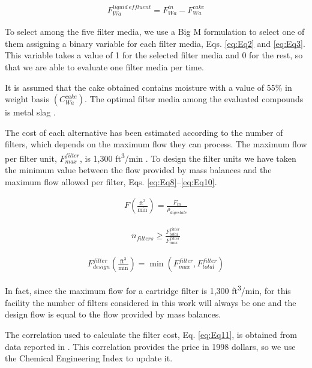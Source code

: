 \begin{refsection}[referencesCh2]
\begin{align}
	F_{Wa}^{{{liquid \ effluent}}} = F_{Wa}^{{in}} - F_{Wa}^{{cake}} \label{eq:Eq7}
\end{align}

To select among the five filter media, we use a Big M formulation to select one of them assigning a binary variable {} for each filter media, Eqs. \ref{eq:Eq2} and \ref{eq:Eq3}. This variable takes a value of 1 for the selected filter media and 0 for the rest, so that we are able to evaluate one filter media per time.

It is assumed that the cake obtained contains moisture with a value of 55\% in weight basis $\left(C_{Wa}^{cake}\right)$. The optimal filter media among the evaluated compounds is metal slag \citep{li2015study}.

The cost of each alternative has been estimated according to the number of filters, which depends on the maximum flow they can process. The maximum flow per filter unit, $F_{max}^{{filter}}$, is 1,300 ft\textsuperscript{3}/min \citep{loh2002process}. To design the filter units we have taken the minimum value between the flow provided by mass balances and the maximum flow allowed per filter, Eqs. \ref{eq:Eq8}–\ref{eq:Eq10}.

\begin{align}
	F\left( {\frac{\text{ft}^3}{\text{min}}} \right) = \frac{{{F_{in}}}}{{{\rho _{{digestate}}}}} \label{eq:Eq8}
\end{align}

\begin{align}
	{n}_{{filters}} \ge \frac{F_{total}^{{filter}}}{F_{{max}}^{{filter}}} 	\label{eq:Eq9}
\end{align}

\begin{align}
	F_{design}^{{filter}}\left( {\frac{\text{ft}^3}{\text{min}}} \right) = \min \left( {F_{max}^{{filter}},F_{total}^{{filter}}} \right) \label{eq:Eq10}
\end{align}

In fact, since the maximum ﬂow for a cartridge filter is 1,300 ft\textsuperscript{3}/min, for this facility the number of ﬁlters considered in this work will always be one and the design ﬂow is equal to the ﬂow provided by mass balances.

The correlation used to calculate the ﬁlter cost, Eq. \ref{eq:Eq11}, is obtained from data reported in \citet{loh2002process}. This correlation provides the price in 1998 dollars, so we use the Chemical Engineering Index to update it.


\end{refsection}

